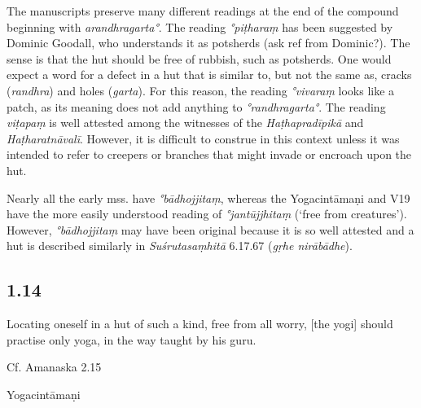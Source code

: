 \begin{ekdosis}
\begin{philcomm}[hp01_013]
The manuscripts preserve many different readings at the end of the compound beginning with \emph{arandhragarta°}. The reading \emph{°piṭharaṃ} has been suggested by Dominic Goodall, who understands it as potsherds (ask ref from Dominic?). The sense is that the hut should be free of rubbish, such as potsherds. One would expect a word for a defect in a hut that is similar to, but not the same as, cracks (\emph{randhra}) and holes (\emph{garta}). For this reason, the reading \emph{°vivaraṃ} looks like a patch, as its meaning does not add anything to \emph{°randhragarta°}. The reading \emph{viṭapaṃ} is well attested among the witnesses of the \emph{Haṭhapradīpikā} and \emph{Haṭharatnāvalī}. However, it is difficult to construe in this context unless it was intended to refer to creepers or branches that might invade or encroach upon the hut.

Nearly all the early mss. have \emph{°bādhojjitaṃ}, whereas the Yogacintāmaṇi and V19 have the more easily understood reading of \emph{°jantūjjhitaṃ} (‘free from creatures’). However, \emph{°bādhojjitaṃ} may have been original because it is so well attested and a hut is described similarly in \emph{Suśrutasaṃhitā} 6.17.67 (\emph{gṛhe nirābādhe}).
\end{philcomm}

\subsection*{1.14}
\begin{translation}[hp01_014]
Locating oneself in a hut of such a kind, free from all worry, [the yogi] should practise only yoga, in the way taught by his guru.
\end{translation}

\begin{sources}[hp01_014]
Cf. Amanaska 2.15

\begin{versinnote}
\end{versinnote}

\end{sources}

\begin{testimonia}[hp01_014]
Yogacintāmaṇi

\begin{versinnote}
\end{versinnote}


\end{testimonia}
\end{ekdosis}
